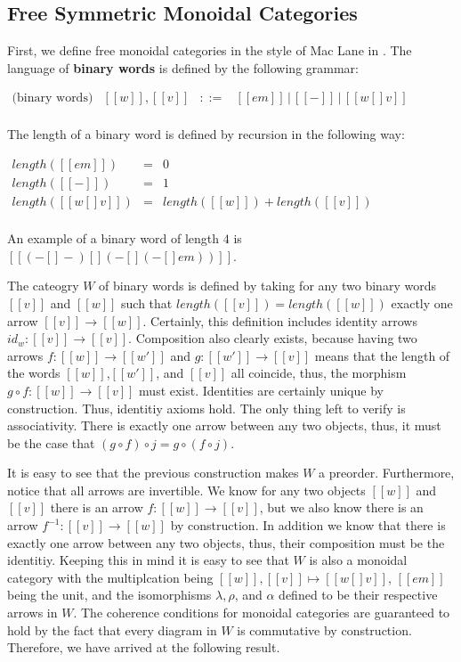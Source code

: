 \subsection{Free Symmetric Monoidal Categories}
\label{subsec:free_symmetric_monoidal_categories}
First, we define free monoidal categories in the style of Mac Lane in \cite{MacLane:1998}. 
The language of \textbf{binary words} is defined by the following grammar:
\begin{center}
  \begin{math}
    \begin{array}{llllllll}
      \text{(binary words)} & [[w]], [[v]] & ::= & [[em]]\,|\,[[-]]\,|\,[[w [] v]]\\
    \end{array}
  \end{math}
\end{center}
The length of a binary word is defined by recursion in the following way:
\begin{center}
  \begin{math}
    \begin{array}{lll}
      length([[em]])  & = & 0\\
      length([[-]]) & = & 1\\
      length([[w [] v]]) & = & length([[w]]) + length([[v]])\\
    \end{array}
  \end{math}
\end{center}
An example of a binary word of length $4$ is $[[(- [] -) [] (- [] (- [] em))]]$.  

The cateogry $W$ of binary words is defined by taking for any two binary words $[[v]]$ and $[[w]]$
such that $length([[v]]) = length([[w]])$ exactly one arrow $[[v]] \to [[w]]$.  Certainly, this definition includes
identity arrows $id_w : [[v]] \to [[v]]$.  Composition also clearly exists, because having two arrows
$f : [[w]] \to [[w']]$ and $g : [[w']] \to [[v]]$ means that the length of the words $[[w]]$,$[[w']]$, and
$[[v]]$ all coincide, thus, the morphism $g \circ f : [[w]] \to [[v]]$ must exist.  Identities are certainly unique
by construction.  Thus, identitiy axioms hold.  The only thing left to verify is associativity.   There is exactly
one arrow between any two objects, thus, it must be the case that $(g \circ f) \circ j = g \circ (f \circ j)$.  

It is easy to see that the previous construction makes $W$ a preorder.  Furthermore, notice that all arrows are invertible. We know
for any two objects $[[w]]$ and $[[v]]$ there is an arrow $f : [[w]] \to [[v]]$, but we also know there is an
arrow $f^{-1} : [[v]] \to [[w]]$ by construction.  In addition we know that there is exactly one arrow between
any two objects, thus, their composition must be the identitiy.  Keeping this in mind it is easy to see that $W$
is also a monoidal category with the multiplcation being $[[w]],[[v]] \mapsto [[w [] v]]$, $[[em]]$ being the 
unit, and the isomorphisms $\lambda,\rho$, and $\alpha$ defined to be their respective arrows in $W$. The
coherence conditions for monoidal categories are guaranteed to hold by the fact that every diagram in $W$ is
commutative by construction.  Therefore, we have arrived at the following result.

